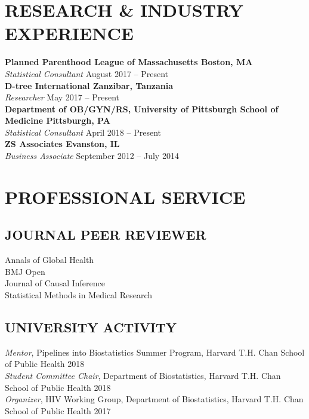 \documentclass[12pt]{article}
\begin{document}
\section*{\textbf{{\large R}{ESEARCH} \& {\large I}{NDUSTRY} {\large E}{XPERIENCE}}}
\textbf{Planned Parenthood League of Massachusetts \hfill \hfill Boston, MA}  \\
\textit{Statistical Consultant} \hfill \hfill August 2017 -- Present \\

\textbf{D-tree International \hfill \hfill Zanzibar, Tanzania} \\
\textit{Researcher} \hfill \hfill May 2017 -- Present \\

\textbf{Department of OB/GYN/RS, University of Pittsburgh School of Medicine \hfill \hfill Pittsburgh, PA}  \\
\textit{ Statistical Consultant} \hfill \hfill April 2018 -- Present \\

\textbf{ZS Associates \hfill \hfill Evanston, IL} \\
\textit{Business Associate} \hfill \hfill September 2012 -- July 2014 

\section*{\textbf{{\large P}{ROFESSIONAL} {\large S}{ERVICE}}}
\subsection*{\textbf{JOURNAL PEER REVIEWER}}
Annals of Global Health \\ 
BMJ Open \\ 
Journal of Causal Inference \\ 
Statistical Methods in Medical Research

\subsection*{\textbf{UNIVERSITY ACTIVITY}}
\textit{Mentor}, Pipelines into Biostatistics Summer Program, Harvard T.H. Chan School of
Public Health \hfill \hfill 2018 \\
\textit{Student Committee Chair}, Department of Biostatistics, Harvard T.H. Chan School of
Public Health \hfill \hfill 2018 \\
\textit{Organizer}, HIV Working Group, Department of Biostatistics, Harvard T.H. Chan School of
Public Health \hfill \hfill 2017 
\end{document}
